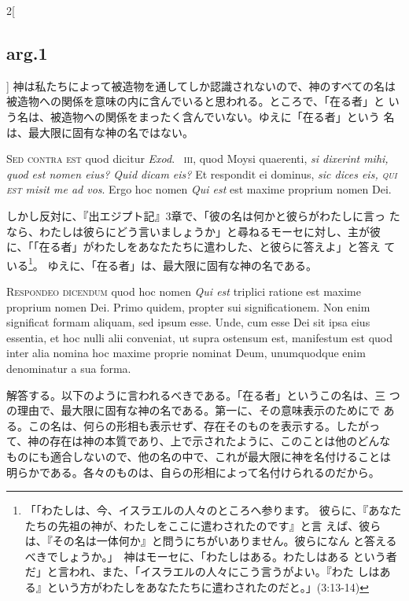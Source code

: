 \documentclass[paper=a4paper,fontsize=10pt,jafontsize=9pt,titlepage]{jlreq}
\begin{document}
\begin{paracol}{2}[\subsection{arg.1}]
神は私たちによって被造物を通してしか認識されないので、神のすべての名は
被造物への関係を意味の内に含んでいると思われる。ところで、「在る者」と
いう名は、被造物への関係をまったく含んでいない。ゆえに「在る者」という
名は、最大限に固有な神の名ではない。

\switchcolumn*[\subsection{s.c.}]

{\scshape Sed contra est} quod dicitur {\itshape Exod}.~{\scshape
iii}, quod Moysi quaerenti, {\itshape si dixerint mihi, quod est nomen
eius? Quid dicam eis?}  Et respondit ei dominus, {\itshape sic dices
eis, {\scshape qui est} misit me ad vos}. Ergo hoc nomen {\itshape Qui
est} est maxime proprium nomen Dei.

\switchcolumn

しかし反対に、『出エジプト記』3章で、「彼の名は何かと彼らがわたしに言っ
たなら、わたしは彼らにどう言いましょうか」と尋ねるモーセに対し、主が彼
に、「「在る者」がわたしをあなたたちに遣わした、と彼らに答えよ」と答え
ている\footnote{「「わたしは、今、イスラエルの人々のところへ参ります。
彼らに、『あなたたちの先祖の神が、わたしをここに遣わされたのです』と言
えば、彼らは、『その名は一体何か』と問うにちがいありません。彼らになん
と答えるべきでしょうか。」　神はモーセに、「わたしはある。わたしはある
という者だ」と言われ、また、「イスラエルの人々にこう言うがよい。『わた
しはある』という方がわたしをあなたたちに遣わされたのだと。」(3:13-14)}。
ゆえに、「在る者」は、最大限に固有な神の名である。


{\scshape Respondeo dicendum} quod hoc nomen {\itshape Qui est}
triplici ratione est maxime proprium nomen Dei. Primo quidem, propter
sui significationem. Non enim significat formam aliquam, sed ipsum
esse. Unde, cum esse Dei sit ipsa eius essentia, et hoc nulli alii
conveniat, ut supra ostensum est, manifestum est quod inter alia
nomina hoc maxime proprie nominat Deum, unumquodque enim denominatur a
sua forma.

\switchcolumn

解答する。以下のように言われるべきである。「在る者」というこの名は、三
つの理由で、最大限に固有な神の名である。第一に、その意味表示のためにで
ある。この名は、何らの形相も表示せず、存在そのものを表示する。したがっ
て、神の存在は神の本質であり、上で示されたように、このことは他のどんな
ものにも適合しないので、他の名の中で、これが最大限に神を名付けることは
明らかである。各々のものは、自らの形相によって名付けられるのだから。


\end{paracol}
\end{document}
